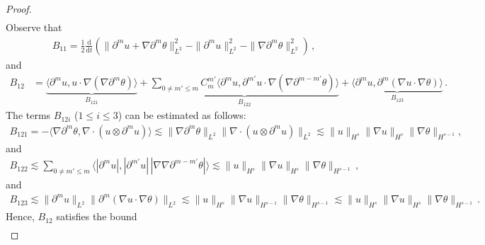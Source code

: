 \documentclass[reqno,11pt]{amsart}
\numberwithin{equation}{section}
\def\p{\partial}
\def\d{\mathrm{d}}
\begin{document}
\begin{proof}
\begin{align*}
\end{align*}
Observe that
\begin{equation*}
\begin{aligned}
B_{11}=\frac{1}{2} \frac{\d}{\d t} \left( \| \p^m u + \nabla \partial^m \theta \|_{L^2}^2 - \| \p^m u \|_{L^2}^2 - \| \nabla \partial^m \theta \|_{L^2}^2 \right) \,,
\end{aligned}
\end{equation*}
and
\begin{equation*}
\begin{aligned}
B_{12}&= \underset{B_{121}}{\underbrace{\langle \p^m u, u \cdot \nabla (\nabla \partial^m \theta) \rangle}} +  \underset{B_{122}}{\underbrace{\sum_{0 \neq m' \leq m} C_m^{m'} \langle \p^m u, \partial^{m'} u \cdot \nabla (\nabla \partial^{m - m'} \theta) \rangle }} +  \underset{B_{123}}{\underbrace{\langle \p^m u, \partial^m (\nabla u \cdot \nabla \theta) \rangle}} \,.
\end{aligned}
\end{equation*}
The terms $B_{12i}$ ($1 \leq i \leq 3$) can be estimated as follows:
\begin{equation*}
\begin{aligned}
B_{121} = - \langle \nabla \partial^m \theta, \nabla \cdot (u \otimes \p^m u) \rangle \lesssim \| \nabla \partial^m \theta \|_{L^2}  \| \nabla \cdot (u \otimes \p^m u) \|_{L^2} \lesssim \| u \|_{H^s} \| \nabla u \|_{H^s} \| \nabla \theta \|_{H^{s-1}} ,
\end{aligned}
\end{equation*}
and
\begin{equation*}
\begin{aligned}
B_{122} \lesssim \sum_{0 \neq m' \leq m} \langle |\p^mu|, |\partial^{m'} u| \, |\nabla \nabla\partial^{m - m'} \theta| \rangle \lesssim \| u \|_{H^s} \| \nabla u \|_{H^s} \| \nabla \theta \|_{H^{s-1}} \,,
\end{aligned}
\end{equation*}
and
\begin{equation*}
\begin{aligned}
B_{123} \lesssim \|\p^m u\|_{L^2} \|\p^m(\nabla u\cdot\nabla\theta)\|_{L^2} \lesssim \| u \|_{H^s} \| \nabla u \|_{H^{s-1}} \| \nabla \theta \|_{H^{s-1}} \lesssim\| u \|_{H^s} \| \nabla u \|_{H^{s}} \| \nabla \theta \|_{H^{s-1}} \,.
\end{aligned}
\end{equation*}
Hence, $B_{12}$ satisfies the bound
\begin{equation*}
\begin{aligned}

\end{aligned}
\end{equation*}
\end{proof}
\end{document}

